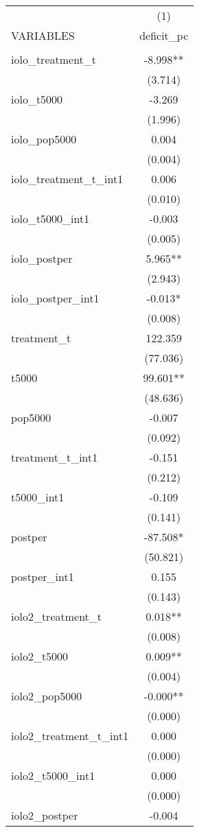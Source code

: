 \documentclass[]{article}
\begin{document}
\begin{tabular}{lc} \hline
 & (1) \\
VARIABLES & deficit\_pc \\ \hline
 &  \\
iolo\_treatment\_t & -8.998** \\
 & (3.714) \\
iolo\_t5000 & -3.269 \\
 & (1.996) \\
iolo\_pop5000 & 0.004 \\
 & (0.004) \\
iolo\_treatment\_t\_int1 & 0.006 \\
 & (0.010) \\
iolo\_t5000\_int1 & -0.003 \\
 & (0.005) \\
iolo\_postper & 5.965** \\
 & (2.943) \\
iolo\_postper\_int1 & -0.013* \\
 & (0.008) \\
treatment\_t & 122.359 \\
 & (77.036) \\
t5000 & 99.601** \\
 & (48.636) \\
pop5000 & -0.007 \\
 & (0.092) \\
treatment\_t\_int1 & -0.151 \\
 & (0.212) \\
t5000\_int1 & -0.109 \\
 & (0.141) \\
postper & -87.508* \\
 & (50.821) \\
postper\_int1 & 0.155 \\
 & (0.143) \\
iolo2\_treatment\_t & 0.018** \\
 & (0.008) \\
iolo2\_t5000 & 0.009** \\
 & (0.004) \\
iolo2\_pop5000 & -0.000** \\
 & (0.000) \\
iolo2\_treatment\_t\_int1 & 0.000 \\
 & (0.000) \\
iolo2\_t5000\_int1 & 0.000 \\
 & (0.000) \\
iolo2\_postper & -0.004 \\

\end{tabular}
\end{document}
